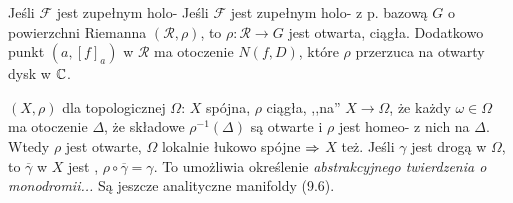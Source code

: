 Jeśli $\mathcal F$ jest zupełnym holo-
Jeśli $\mathcal F$ jest zupełnym holo- z p. bazową $G$ o powierzchni Riemanna $(\mathscr R, \rho)$, to $\rho \colon \mathscr R \to G$ jest otwarta, ciągła.
Dodatkowo punkt $(a, [f]_a)$ w $\mathscr R$ ma otoczenie $N(f,D)$, które $\rho$ przerzuca na otwarty dysk w $\mathbb{C}$.




  $(X,\rho)$ dla topologicznej $\Omega$: $X$ spójna, $\rho$ ciągła, ,,na'' $X \to \Omega$, że każdy $\omega \in \Omega$ ma otoczenie $\Delta$, że składowe $\rho^{-1}(\Delta)$ są otwarte i $\rho$ jest homeo- z nich na $\Delta$.
Wtedy $\rho$ jest otwarte, $\Omega$ lokalnie łukowo spójne $\Rightarrow$ $X$ też.
Jeśli $\gamma$ jest drogą w $\Omega$, to $\overline \gamma$ w $X$ jest , $\rho \circ \overline \gamma = \gamma$.
To umożliwia określenie \emph{abstrakcyjnego twierdzenia o monodromii...}
Są jeszcze analityczne manifoldy (9.6).